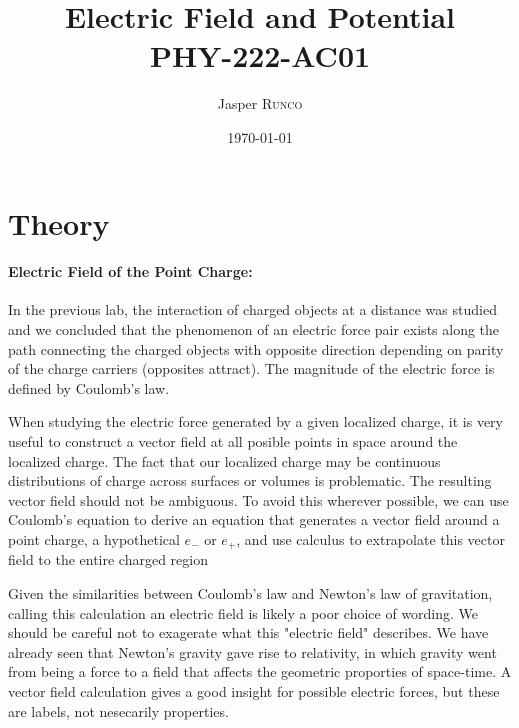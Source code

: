 \documentclass{article}
\title{Electric Field and Potential\\ PHY-222-AC01} %
\author{Jasper \textsc{Runco}} %
\date{\today} %
\begin{document}
\maketitle %



\section{Theory}

\paragraph{Electric Field of the Point Charge:}

In the previous lab, the interaction of charged objects at a distance was studied and we concluded
that the phenomenon of an electric force pair exists along the path connecting the charged objects
with opposite direction depending on parity of the charge carriers (opposites attract). The magnitude
of the electric force is defined by Coulomb's law.
\newline

When studying the electric force generated by a given
localized charge, it is very useful to construct a vector field at all posible points in space around
the localized charge. The fact that our localized charge may be continuous distributions of charge
across surfaces or volumes is problematic. The resulting vector field should not be ambiguous. To avoid
this wherever possible, we can use Coulomb's equation to derive an equation that generates a vector field
around a point charge, a hypothetical $e_{-}$ or $e_{+}$, and use calculus to extrapolate this vector
field to the entire charged region
\newline

Given the similarities between Coulomb's law and Newton's law of gravitation, calling this calculation
an electric field is likely a poor choice of wording. We should be careful not to exagerate what this
"electric field" describes. We have already seen that Newton's gravity gave rise to relativity, in which
gravity went from being a force to a field that affects the geometric proporties of space-time. A vector
field calculation gives a good insight for possible electric forces, but these are labels, not nesecarily
properties.
\end{document}
